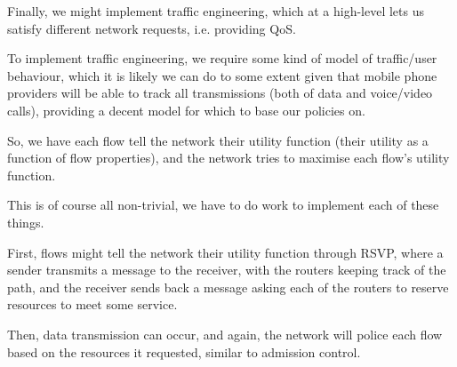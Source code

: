 Finally, we might implement traffic engineering, which at a high-level lets us satisfy different network requests, i.e. providing QoS.

To implement traffic engineering, we require some kind of model of traffic/user behaviour, which it is likely we can do to some extent given that mobile phone providers will be able to track all transmissions (both of data and voice/video calls), providing a decent model for which to base our policies on.

So, we have each flow tell the network their utility function (their utility as a function of flow properties), and the network tries to maximise each flow's utility function.

This is of course all non-trivial, we have to do work to implement each of these things.

First, flows might tell the network their utility function through RSVP, where a sender transmits a message to the receiver, with the routers keeping track of the path, and the receiver sends back a message asking each of the routers to reserve resources to meet some service.

Then, data transmission can occur, and again, the network will police each flow based on the resources it requested, similar to admission control.






